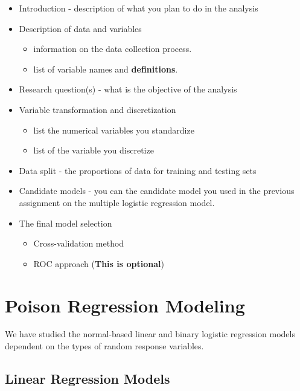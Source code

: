 \documentclass[
]{book}
\begin{document}
\begin{itemize}
\item
  Introduction - description of what you plan to do in the analysis
\item
  Description of data and variables

  \begin{itemize}
  \item
    information on the data collection process.
  \item
    list of variable names and \textbf{definitions}.
  \end{itemize}
\item
  Research question(s) - what is the objective of the analysis
\item
  Variable transformation and discretization

  \begin{itemize}
  \item
    list the numerical variables you standardize
  \item
    list of the variable you discretize
  \end{itemize}
\item
  Data split - the proportions of data for training and testing sets
\item
  Candidate models - you can the candidate model you used in the previous assignment on the multiple logistic regression model.
\item
  The final model selection

  \begin{itemize}
  \item
    Cross-validation method
  \item
    ROC approach (\textbf{This is optional})
  \end{itemize}
\end{itemize}

\hypertarget{poison-regression-modeling}{%
\chapter{Poison Regression Modeling}\label{poison-regression-modeling}}

We have studied the normal-based linear and binary logistic regression models dependent on the types of random response variables.

\hypertarget{linear-regression-models}{%
\section{Linear Regression Models}\label{linear-regression-models}}
\end{document}
